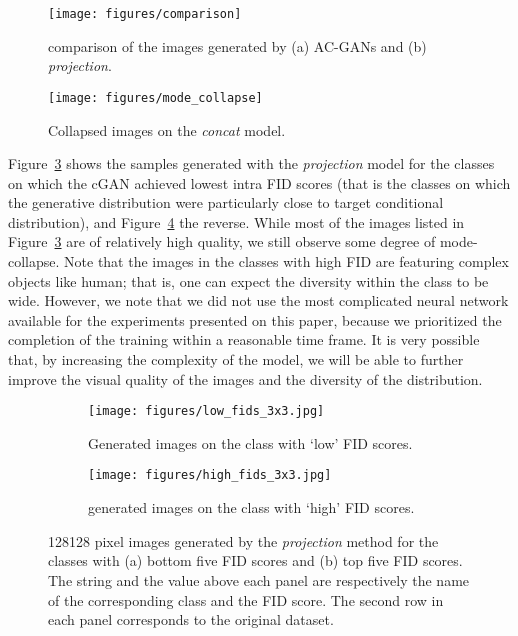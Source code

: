 \documentclass{article}
\begin{document}
\begin{figure}[t]
  \centering
  \texttt{[image: figures/comparison]}
  \caption{\label{fig:comparison}
  comparison of the images generated by (a) AC-GANs and (b) \textit{projection}.} 
\end{figure}

\begin{figure}[t]
  \centering
  \texttt{[image: figures/mode\_collapse]}
  \caption{\label{fig:collapse} Collapsed images on the \textit{concat} model.} 
\end{figure}

Figure~\ref{fig:low_fids} shows the samples generated with the \textit{projection} model for the classes on which the cGAN achieved lowest intra FID scores (that is the classes on which the generative distribution were particularly close to target conditional distribution), and Figure~\ref{fig:high_fids} the reverse.
While most of the images listed in Figure~\ref{fig:low_fids} are of relatively high quality, we still observe some degree of mode-collapse.
Note that the images in the classes with high FID are featuring complex objects like human; that is, one can expect the diversity within the class to be wide.
However, we note that we did not use the most complicated neural network available for the experiments presented on this paper, because we prioritized the completion of the training within a reasonable time frame.
It is very possible that, by increasing the complexity of the model, we will be able to further improve the visual quality of the images and the diversity of the distribution.
\begin{figure}[t]
	\centering
	\begin{subfigure}{1.\textwidth}
	\texttt{[image: figures/low\_fids\_3x3.jpg]}
        \caption{
\label{fig:low_fids} Generated images on the class with `low' FID scores.}
    \end{subfigure}
    \begin{subfigure}{1.\textwidth}
        \centering
	    \texttt{[image: figures/high\_fids\_3x3.jpg]}
        \caption{
    \label{fig:high_fids} generated images on the class with `high' FID scores.}
    \end{subfigure}
    \caption{
    \label{fig:gen_projection}
    128128 pixel images generated by the \textit{projection} method for the classes with (a) bottom five FID scores and (b) top five FID scores. 
    The string and the value above each panel are respectively the name of the corresponding class and the FID score. The second row in each panel corresponds to the original dataset.}
\end{figure}
\end{document}
